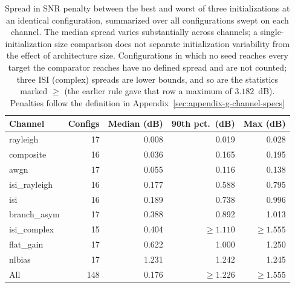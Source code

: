 \begin{table}[htbp]
\centering
\caption[Across-initialization spread]{Spread in SNR penalty between the best and worst of three initializations at an identical configuration, summarized over all configurations swept on each channel. The median spread varies substantially across channels; a single-initialization size comparison does not separate initialization variability from the effect of architecture size. Configurations in which no seed reaches every target the comparator reaches have no defined spread and are not counted; three ISI (complex) spreads are lower bounds, and so are the statistics marked $\geq$ (the earlier rule gave that row a maximum of $3.182$~dB). Penalties follow the definition in Appendix~\ref{sec:appendix-g-channel-specs}}\label{tbl:seed-spread}
\begin{tabular}{lrrrr}
\toprule
Channel & Configs & Median (dB) & 90th pct.\ (dB) & Max (dB) \\
\midrule
rayleigh      & 17 & 0.008 & 0.019 & 0.028 \\
composite     & 16 & 0.036 & 0.165 & 0.195 \\
awgn          & 17 & 0.055 & 0.116 & 0.138 \\
isi\_rayleigh & 16 & 0.177 & 0.588 & 0.795 \\
isi           & 16 & 0.189 & 0.738 & 0.996 \\
branch\_asym  & 17 & 0.388 & 0.892 & 1.013 \\
isi\_complex  & 15 & 0.404 & ${\geq}1.110$ & ${\geq}1.555$ \\
flat\_gain    & 17 & 0.622 & 1.000 & 1.250 \\
nlbias        & 17 & 1.231 & 1.242 & 1.245 \\
\midrule
All           & 148 & 0.176 & ${\geq}1.226$ & ${\geq}1.555$ \\
\bottomrule
\end{tabular}
\end{table}

